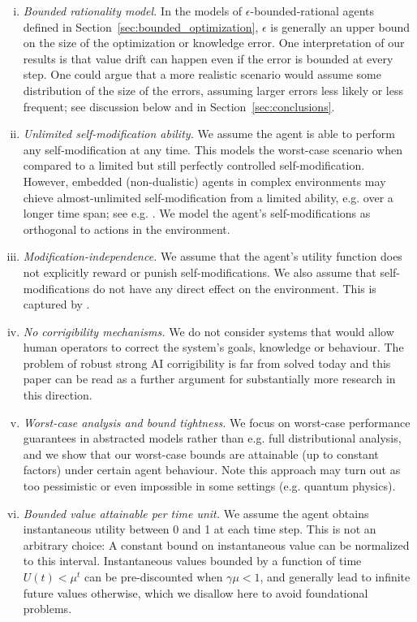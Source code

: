 \begin{enumerate}[(i)]
    \item \emph{Bounded rationality model.} In the models of $\epsilon$-bounded-rational agents defined in Section~\ref{sec:bounded_optimization}, $\epsilon$ is generally an upper bound on the size of the optimization or knowledge error. One interpretation of our results is that value drift can happen even if the error is bounded at every step. One could argue that a more realistic scenario would assume some distribution of the size of the errors, assuming larger errors less likely or less frequent; see discussion below and in Section~\ref{sec:conclusions}.
    \item \emph{Unlimited self-modification ability.} We assume the agent is able to perform any self-modification at any time. This models the worst-case scenario when compared to a limited but still perfectly controlled self-modification. However, embedded (non-dualistic) agents in complex environments may chieve almost-unlimited self-modification from a limited ability, e.g. over a longer time span; see e.g. \cite{EmbeddedAgency}. We model the agent's self-modifications as orthogonal to actions in the environment.
    \item \emph{Modification-independence.} We assume that the agent's utility function does not explicitly reward or punish self-modifications. We also assume that self-modifications do not have any direct effect on the environment. This is captured by .
    \item \emph{No corrigibility mechanisms.} We do not consider systems that would allow human operators to correct the system's goals, knowledge or behaviour. The problem of robust strong AI corrigibility is far from solved today and this paper can be read as a further argument for substantially more research in this direction.
    \item \emph{Worst-case analysis and bound tightness.} We focus on worst-case performance guarantees in abstracted models rather than e.g. full distributional analysis, and we show that our worst-case bounds are attainable (up to constant factors) under certain agent behaviour. Note this approach may turn out as too pessimistic or even impossible in some settings (e.g. quantum physics).
    \item \emph{Bounded value attainable per time unit.} We assume the agent obtains instantaneous utility between 0 and 1 at each time step. This is not an arbitrary choice: A constant bound on instantaneous value can be normalized to this interval. Instantaneous values bounded by a function of time $U(t)<\mu^t$ can be pre-discounted when $\gamma\mu<1$, and generally lead to infinite future values otherwise, which we disallow here to avoid foundational problems.

\end{enumerate}
